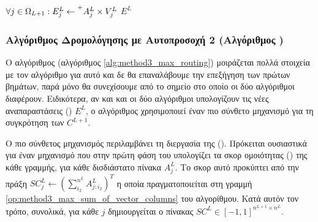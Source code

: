 {\begin{algorithm}[H]
\begin{algorithmic}[1]
      
    \State $\forall j \in \Omega_{L+1}: E^L_j \gets \prescript{+}{}{A_j^L} \times V_j^L$  \label{op:method3_sum_weighted_sum} %
    \State \Return $E^L$ 
    \EndProcedure

  \end{algorithmic}
  \end{algorithm}
}

\subsubsection{Αλγόριθμος Δρομολόγησης με Αυτο\textendash προσοχή 2 (Αλγόριθμος )}
Ο αλγόριθμος  (αλγόριθμος \ref{alg:method3_max_routing}) μοιράζεται πολλά στοιχεία με τον αλγόριθμο  για αυτό και δε θα επαναλάβουμε την επεξήγηση των πρώτων βημάτων, παρά μόνο θα συνεχίσουμε από το σημείο στο οποίο οι δύο αλγόριθμοι διαφέρουν. Ειδικότερα, αν και και οι δύο αλγόριθμοι υπολογίζουν τις νέες αναπαραστάσεις () $E^L$, ο αλγόριθμος  χρησιμοποιεί έναν πιο σύνθετο μηχανισμό για τη συγκρότηση των $C^{L+1}$.\par

Ο πιο σύνθετος μηχανισμός περιλαμβάνει τη διεργασία της  (). Πρόκειται ουσιαστικά για έναν μηχανισμό που στην πρώτη φάση του υπολογίζει τα σκορ ομοιότητας () της κάθε γραμμής, για κάθε δισδιάστατο πίνακα $A_j^L$. Το σκορ αυτό προκύπτει από την πράξη $SC_j^L \gets (\sum_{i_2}^{n^L} A^L_{j:i_2})^T$ η οποία πραγματοποιείται στη γραμμή \ref{op:method3_max_sum_of_vector_columns} του αλγορίθμου. Κατά αυτόν τον τρόπο, συνολικά, για κάθε $j$ δημιουργείται ο πίνακας $SC^L \in [-1, 1]^{n^{L+1}\times n^L}$.\par

